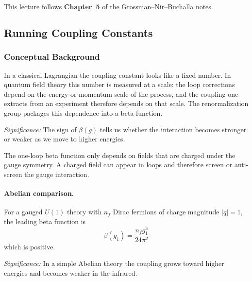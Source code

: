 \documentclass[../main.tex]{subfiles}
\begin{document}
This lecture follows \textbf{Chapter~5} of the Grossman--Nir--Buchalla notes.

\subsection{Running Coupling Constants}\label{sec:lec14:running}

\subsubsection*{Conceptual Background}

In a classical Lagrangian the coupling constant looks like a fixed number. In quantum field theory this number is measured at a scale: the loop corrections depend on the energy or momentum scale of the process, and the coupling one extracts from an experiment therefore depends on that scale. The renormalization group packages this dependence into a beta function.


\textit{Significance:} The sign of $\beta(g)$ tells us whether the interaction becomes stronger or weaker as we move to higher energies.

The one-loop beta function only depends on fields that are charged under the gauge symmetry. A charged field can appear in loops and therefore screen or anti-screen the gauge interaction.

\paragraph{Abelian comparison.}
For a gauged $U(1)$ theory with $n_f$ Dirac fermions of charge magnitude $|q|=1$, the leading beta function is
\begin{equation}
  \boxed{\;\beta(g_1)=\frac{n_f g_1^3}{24\pi^2}\;}
  \label{eq:lec14:u1_beta}
\end{equation}
which is positive.

\textit{Significance:} In a simple Abelian theory the coupling grows toward higher energies and becomes weaker in the infrared.
\end{document}
